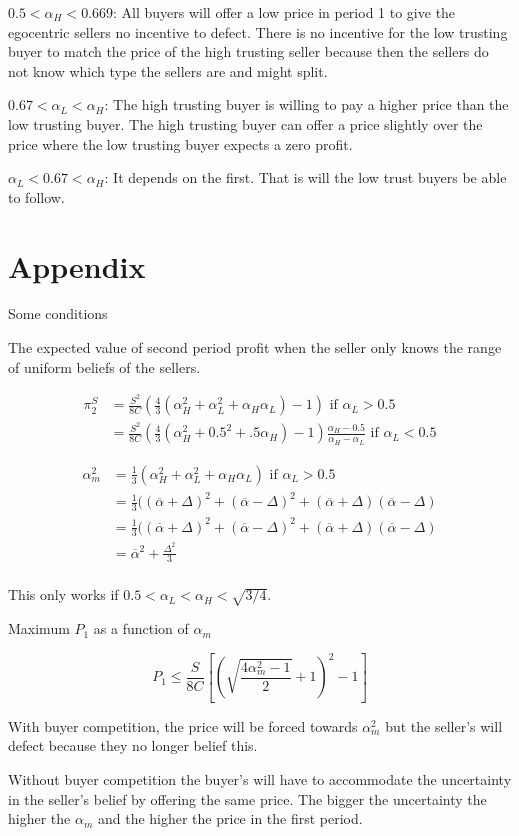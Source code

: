 \documentclass{article}
\begin{document}
\emph{$0.5 < \alpha_H < 0.669$}: All buyers will offer a low price in period 1 to give the egocentric sellers no incentive to defect. There is no incentive for the low trusting buyer to match the price of the high trusting seller because then the sellers do not know which type the sellers are and might split. 

\emph{$0.67 < \alpha_L < \alpha_H$}: The high trusting buyer is willing to pay a higher price than the low trusting buyer. The high trusting buyer can offer a price slightly over the price where the low trusting buyer expects a zero profit.

\emph{$\alpha_L < 0.67 < \alpha_H$}: It depends on the first. That is will the low trust buyers be able to follow. 


\section{Appendix}

Some conditions

The expected value of second period profit when the seller only knows the range of uniform beliefs of the sellers.

\begin{align*}
\pi^S_2 &= \frac{S^2}{8C}(\frac{4}{3}(\alpha_H^2 + \alpha_L^2 + \alpha_H \alpha_L) - 1) \text{ if } \alpha_L > 0.5 \\
&= \frac{S^2}{8C}(\frac{4}{3}(\alpha_H^2 + 0.5^2 + .5 \alpha_H) - 1) \frac{\alpha_H - 0.5}{\alpha_H - \alpha_L} \text{ if } \alpha_L < 0.5
\end{align*}

\begin{align*}
\alpha_m^2 &= \frac{1}{3}(\alpha_H^2 + \alpha^2_L + \alpha_H \alpha_L) \text{ if } \alpha_L > 0.5 \\
&= \frac{1}{3} ((\overline{\alpha} + \Delta)^2 + (\overline{\alpha} - \Delta)^2 + (\overline{\alpha} + \Delta) (\overline{\alpha} - \Delta) \\
&= \frac{1}{3} ((\overline{\alpha} + \Delta)^2 + (\overline{\alpha} - \Delta)^2 + (\overline{\alpha} + \Delta) (\overline{\alpha} - \Delta) \\
&= \overline{\alpha}^2 + \frac{\Delta^2}{3} \\
\end{align*}

This only works if $0.5 < \alpha_L < \alpha_H < \sqrt{3/4}$. 

Maximum $P_1$ as a function of $\alpha_m$


$$
P_1 \leq \frac{S}{8C}
    [(\sqrt{\frac{4 \alpha_m^2 - 1}{2}} + 1)^2 - 1]
$$

With buyer competition, the price will be forced towards $\alpha_m^2$ but the seller's will defect because they no longer belief this.

Without buyer competition the buyer's will have to accommodate the uncertainty in the seller's belief by offering the same price. The bigger the uncertainty the higher the $\alpha_m$ and the higher the price in the first period. 



\end{document}
